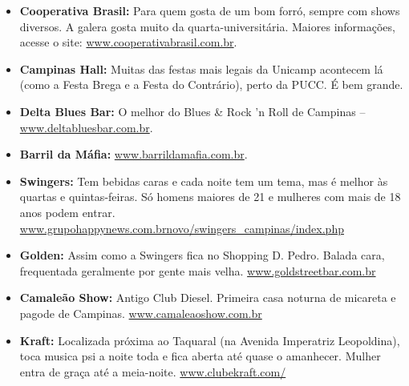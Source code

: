 \begin{itemize}
\item  \textbf{Cooperativa Brasil:} Para quem gosta de um bom forró, sempre com shows diversos. A galera gosta muito da quarta-universitária. Maiores informações, acesse o site: \url{www.cooperativabrasil.com.br}.
\end{itemize}

\begin{itemize}
\item  \textbf{Campinas Hall:} Muitas das festas mais legais da Unicamp acontecem lá (como a Festa Brega e a Festa do Contrário), perto da PUCC. É bem grande.
\end{itemize}

\begin{itemize}
\item  \textbf{Delta Blues Bar:} O melhor do Blues \& Rock 'n Roll de Campinas -- \url{www.deltabluesbar.com.br}.
\end{itemize}

\begin{itemize}
\item  \textbf{Barril da Máfia:} \url{www.barrildamafia.com.br}.
\end{itemize}

\begin{itemize}
\item  \textbf{Swingers:} Tem bebidas caras e cada noite tem um tema, mas é melhor às quartas e quintas-feiras. Só homens maiores de 21 e mulheres com mais de 18 anos podem entrar. \url{www.grupohappynews.com.brnovo/swingers_campinas/index.php}
\end{itemize}

\begin{itemize}
\item  \textbf{Golden:} Assim como a Swingers fica no Shopping D. Pedro. Balada cara, frequentada geralmente por gente mais velha. \url{www.goldstreetbar.com.br}
\end{itemize}

\begin{itemize}
\item  \textbf{Camaleão Show:} Antigo Club Diesel. Primeira casa noturna de micareta e pagode de Campinas. \url{www.camaleaoshow.com.br}
\end{itemize}

\begin{itemize}
\item  \textbf{Kraft:} Localizada próxima ao Taquaral (na Avenida Imperatriz Leopoldina), toca musica psi a noite toda e fica aberta até quase o amanhecer. Mulher entra de graça até a meia-noite. \url{www.clubekraft.com/}
\end{itemize}

